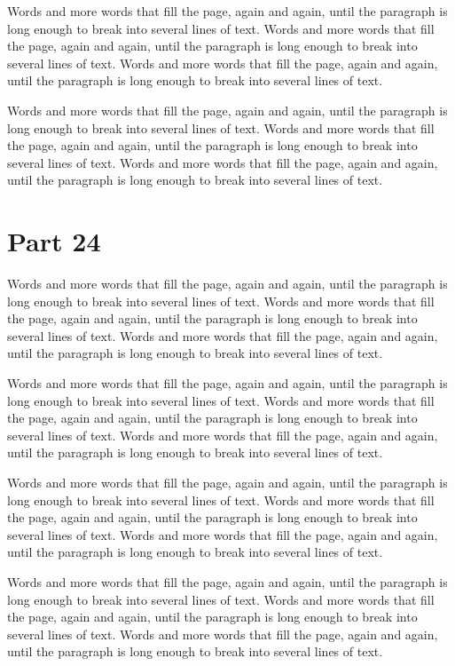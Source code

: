 \documentclass{article}
\begin{document}
Words and more words that fill the page, again and again, until the paragraph is long enough to break into several lines of text. Words and more words that fill the page, again and again, until the paragraph is long enough to break into several lines of text. Words and more words that fill the page, again and again, until the paragraph is long enough to break into several lines of text. 

Words and more words that fill the page, again and again, until the paragraph is long enough to break into several lines of text. Words and more words that fill the page, again and again, until the paragraph is long enough to break into several lines of text. Words and more words that fill the page, again and again, until the paragraph is long enough to break into several lines of text. 

\section{Part 24}
Words and more words that fill the page, again and again, until the paragraph is long enough to break into several lines of text. Words and more words that fill the page, again and again, until the paragraph is long enough to break into several lines of text. Words and more words that fill the page, again and again, until the paragraph is long enough to break into several lines of text. 

Words and more words that fill the page, again and again, until the paragraph is long enough to break into several lines of text. Words and more words that fill the page, again and again, until the paragraph is long enough to break into several lines of text. Words and more words that fill the page, again and again, until the paragraph is long enough to break into several lines of text. 

Words and more words that fill the page, again and again, until the paragraph is long enough to break into several lines of text. Words and more words that fill the page, again and again, until the paragraph is long enough to break into several lines of text. Words and more words that fill the page, again and again, until the paragraph is long enough to break into several lines of text. 

Words and more words that fill the page, again and again, until the paragraph is long enough to break into several lines of text. Words and more words that fill the page, again and again, until the paragraph is long enough to break into several lines of text. Words and more words that fill the page, again and again, until the paragraph is long enough to break into several lines of text. 
\end{document}
